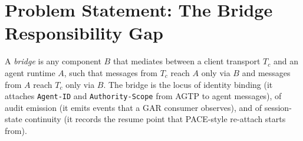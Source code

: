 \section{Problem Statement: The Bridge Responsibility Gap}
\label{sec:problem}

\begin{definition}\label{def:bridge}
A \emph{bridge} is any component $B$ that mediates between a client
transport $T_c$ and an agent runtime $A$, such that messages from
$T_c$ reach $A$ only via $B$ and messages from $A$ reach $T_c$ only
via $B$. The bridge is the locus of identity binding (it attaches
\texttt{Agent-ID} and \texttt{Authority-Scope} from AGTP to agent
messages), of audit emission (it emits events that a GAR consumer
observes), and of session-state continuity (it records the resume point
that PACE-style re-attach starts from).
\end{definition}

